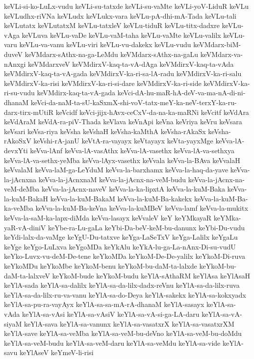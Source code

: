 {keVLi-si-ko-LuLx-vudu
keVLi-su-tatxde
keVLi-su-vaMte
keVLi-yoV-LiduR
keVLu
keVLudhx-riVNa
keVLudx
keVLukx-vara
keVLu-pA-dhi-mA-Tada
keVLu-tali
keVLutatx
keVLutatxM
keVLu-tatxleV
keVLu-tiduR
keVLu-titx-dadxre
keVLu-vAga
keVLuva
keVLu-vaDe
keVLu-vaM-taha
keVLu-vaMte
keVLu-valilx
keVLu-varu
keVLu-va-vanu
keVLu-viri
keVLu-vu-dakekx
keVLu-vudu
keVMdarx-biM-duveV
keVMdarx-sAthx-na-ga-LeMdu
keVMdarx-sAthx-na-gaLu
keVMdarx-va-nAnxgi
keVMdarxveV
keVMdirxV-kaq-ta-vA-dAga
keVMdirxV-kaq-ta-vAda
keVMdirxV-kaq-ta-vA-gada
keVMdirxV-ka-ri-sa-lA-radu
keVMdirxV-ka-ri-salu
keVMdirxV-ka-risi
keVMdirxV-ka-ri-si-dare
keVMdirxV-ka-ri-side
keVMdirxV-ka-ri-su-vudu
keVMdirx-kaq-ta-vA-gada
keVci-dA-hu-maR-hA-deV-va-ma-nA-di-ni-dhanaM
keVci-da-naM-ta-sU-kaSxmX-shi-voV-tatx-meY-ka-neV-terxY-ka-ru-darx-tirx-mUtiR
keVcidf
keVci-jijx-hAvx-ceCxV-da-na-ka-maRNi
keVcitf
keVdAra
keVdAraM
keVdA-ra-piV-Thada
keVlava
keVnApi
keVna
keVriya
keVru
keVsara
keVsari
keVsa-riya
keVsha
keVshaH
keVsha-kaMthA
keVsha-rAkaSx
keVsha-rAkoSxV
keVshi-rA-janU
keVtA-ra-vayayx
keVtayayx
keVta-yayxMge
keVva-lA-devxYti
keVva-lAnf
keVva-lA-vasAthx
keVva-lA-vasethx
keVva-lA-va-sethxya
keVva-lA-va-sethx-yeMba
keVva-lAyx-vasethx
keVvala
keVva-la-BAva
keVvalaH
keVvalaM
keVva-laM-ga-LeYduM
keVva-la-barxhamx
keVva-la-haq-da-yave
keVva-la-jAcnxna
keVva-la-jAcnxnaM
keVva-la-jAcnx-na-veM-budu
keVva-la-jAcnx-na-veM-deMba
keVva-la-jAcnx-naveV
keVva-la-ka-lipxtA
keVva-la-kuM-Baka
keVva-la-kuM-BakaH
keVva-la-kuM-BakaM
keVva-la-kuM-Ba-kakekx
keVva-la-kuM-Ba-ka-veMba
keVva-la-kuM-Ba-keVna
keVva-la-kuMBeV
keVva-lamf
keVva-la-mukitx
keVva-la-saM-ka-lapx-diMda
keVva-lasayx
keVvaleV
keY
keYMkayaR
keYMka-yaR-vA-diniV
keYbe-ra-Lu-gaLa
keYbi-Da-beV-keM-bu-danunx
keYbi-Du-vudu
keYdi-lalx-da-vaMge
keYgU-Du-tatxve
keYga-LaSeTxV
keYga-Lalilx
keYgaLu
keYge
keYgo-LuLxva
keYgoMDa
keYkAlu
keYkA-lu-ga-La-nAnx-Di-su-vudU
keYko-Luvx-vu-deM-De-tene
keYkoMDa
keYkoM-De-De-yalilx
keYkoM-Di-ruva
keYkoMDu
keYkoMbe
keYkoM-benu
keYkoM-bu-daM-ta-lalxde
keYkoM-bu-daM-ta-lalxveV
keYkoM-bude
keYkoM-budu
keYlA-sAthaRM
keYlAsa
keYlAsaH
keYlA-sada
keYlA-sa-dalilx
keYlA-sa-da-lilx-dadx-reVnu
keYlA-sa-da-lilx-ruva
keYlA-sa-da-lilx-ru-va-vanu
keYlA-sa-do-Deya
keYlA-sakekx
keYlA-sa-kokxyadx
keYlA-sa-pu-ra-vayAyx
keYlA-sa-sa-mA-rA-dhanaM
keYlA-sasayx
keYlA-sa-vAda
keYlA-sa-vAsi
keYlA-sa-vAsiV
keYlA-sa-vA-si-ga-LA-daru
keYlA-sa-vA-siyaM
keYlA-sava
keYlA-sa-vanunx
keYlA-sa-vasatxrX
keYlA-sa-vasatxrXM
keYlA-save
keYlA-sa-veMba
keYlA-sa-veM-bu-deVno
keYlA-sa-veM-bu-doMdu
keYlA-sa-veM-budu
keYlA-sa-veM-daru
keYlA-sa-veMdu
keYlA-sa-vide
keYlA-savu
keYlAseV
keYmeV-li-risi
}
